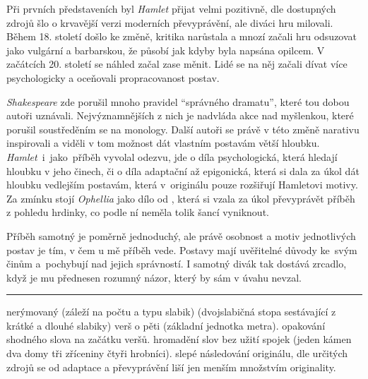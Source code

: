 \documentclass[FGBook.tex]{subfiles}
\begin{document}

\noindent
Při prvních představeních byl \textit{Hamlet} přijat velmi pozitivně, dle dostupných zdrojů šlo o krvavější verzi moderních převyprávění, ale diváci hru milovali.
Během 18. století došlo ke změně, kritika narůstala a mnozí začali hru odsuzovat jako vulgární a barbarskou, že působí jak kdyby byla napsána opilcem.
V začátcích 20. století se náhled začal zase měnit.
Lidé se na něj začali dívat více psychologicky a oceňovali propracovanost postav.

\noindent
\textit{Shakespeare} zde porušil mnoho pravidel \enquote{správného dramatu},
které tou dobou autoři uznávali.
Nejvýznamnějších z nich je nadvláda akce nad myšlenkou, které porušil soustředěním se na monology.
Další autoři se právě v této změně narativu inspirovali
a viděli v tom možnost dát vlastním postavám větší hloubku.
\textit{Hamlet}~i~jako~příběh vyvolal odezvu, jde o díla psychologická,
která hledají hloubku v jeho činech, či o díla adaptační až epigonická,
která si dala za úkol dát hloubku vedlejším postavám, která v~originálu pouze rozšiřují Hamletovi motivy. \\
Za zmínku stojí \textit{Ophellia} jako dílo od ,
která si vzala za úkol převyprávět příběh z pohledu hrdinky, co podle ní neměla tolik šancí vyniknout.


\noindent 
Příběh samotný je poměrně jednoduchý, ale právě osobnost a motiv jednotlivých postav je tím,
v čem u mě příběh vede.
Postavy mají uvěřitelné důvody ke~svým činům a~pochybují nad jejich správností.
I samotný divák tak dostává zrcadlo, když je mu přednesen rozumný názor, který by sám v úvahu nevzal.
    
\vfill

\noindent\begin{minipage}{\textwidth}
    {\textcolor{\wpagecolor}{\rule{\linewidth}{0.4pt}}
     nerýmovaný 
    (záleží na počtu a typu slabik) 
    (dvojslabičná stopa sestávající z krátké a dlouhé slabiky) verš o pěti
     (základní jednotka metra).
     opakování shodného slova na začátku veršů.
     hromadění slov bez užití spojek
    (jeden kámen dva domy tři zříceniny čtyři hrobníci).
     slepé následování originálu, dle určitých zdrojů se od adaptace
    a převyprávění liší jen menším množstvím originality.
    }
\end{minipage}

\newpage
\end{document}
